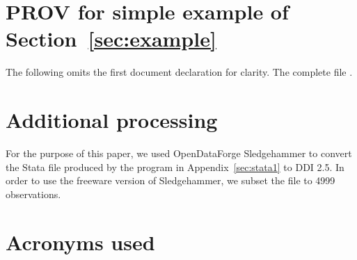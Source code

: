 \documentclass[x11names]{article}
\begin{document}


%

\section{PROV for simple example of Section~\ref{sec:example}}
\label{sec:example:prov}
The following omits the first document declaration for clarity. The complete file 
.


\section{Additional processing}
For the purpose of this paper, 
 we used OpenDataForge Sledgehammer to convert the Stata file produced by the program in 
Appendix~\ref{sec:stata1} to DDI 2.5. In order to use the freeware version of Sledgehammer, we subset the file to 4999 
observations. 



\section*{Acronyms used}

\end{document}
